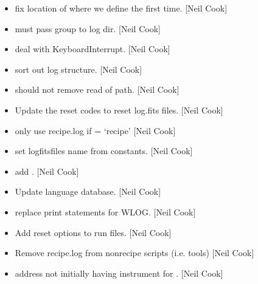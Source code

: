 \documentclass[a4paper,10pt,english]{report}
\begin{document}
\begin{itemize}
\item {} 
 \sphinxhyphen{} fix location of where we define
 the first time. {[}Neil Cook{]}

\item {} 
 \sphinxhyphen{} must pass group to log dir. {[}Neil Cook{]}

\item {} 
 \sphinxhyphen{} deal with KeyboardInterrupt.
{[}Neil Cook{]}

\item {} 
 \sphinxhyphen{} sort out log structure. {[}Neil Cook{]}

\item {} 
 \sphinxhyphen{} should not remove read of path. {[}Neil Cook{]}

\item {} 
Update the reset codes to reset log.fits files. {[}Neil Cook{]}

\item {} 
 \sphinxhyphen{} only use recipe.log if  =
‘recipe’ {[}Neil Cook{]}

\item {} 
 \sphinxhyphen{} set logfitsfiles name from constants. {[}Neil
Cook{]}

\item {} 
 \sphinxhyphen{} add .
{[}Neil Cook{]}

\item {} 
Update language database. {[}Neil Cook{]}

\item {} 
 \sphinxhyphen{} replace print statements for WLOG. {[}Neil Cook{]}

\item {} 
Add reset options to run files. {[}Neil Cook{]}

\item {} 
Remove recipe.log from non\sphinxhyphen{}recipe scripts (i.e. tools) {[}Neil Cook{]}

\item {} 
 \sphinxhyphen{} address not initially having instrument for
. {[}Neil Cook{]}


\end{itemize}
\end{document}
